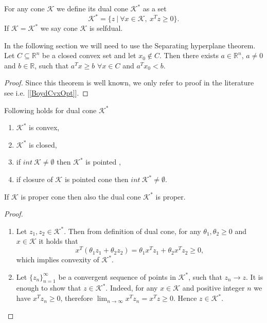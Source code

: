 \documentclass[12pt]{book}
\theoremstyle{definition}
\begin{document}
\begin{appendix}
\label{defDualCone}
For any cone $\mathcal{K}$ we define its dual cone $\mathcal{K}^*$ as a set
\begin{equation}
\mathcal{K}^* = \{z\ |\ \forall x\in\mathcal{K}, \ x^Tz\geq 0\}.
\end{equation}
If  $\mathcal{K} =  \mathcal{K}^*$ we say cone $\mathcal{K}$ is selfdual.



In the following section we will need to use the Separating hyperplane theorem.
\label{SeparatingHyperplaneThm}
Let $C\subseteq \mathbb{R}^n$ be a closed convex set and let $x_0\notin C$. 
Then there exists $a \in \mathbb{R}^n$, $a\neq 0$ and $b\in \mathbb{R}$, such that 
$a^Tx\geq b$ $\forall x\in C$ and $a^Tx_0<b$.
\begin{proof}
Since this theorem is well known, we only refer to proof in the literature see i.e. [\ref{BoydCvxOpt}]. %
\end{proof}

\prop[{[\ref{PokornaSOCPDipl}]}] \label{DualConePropertiesProp}
Following holds for dual cone $\mathcal{K}^*$
\begin{enumerate}
\item  $\mathcal{K}^*$ is convex,
\item  $\mathcal{K}^*$ is closed,
\item if $int \ \mathcal{K}\neq \emptyset$ then $\mathcal{K}^*$ is pointed ,
\item if closure of $\mathcal{K}$ is pointed cone then $int \ \mathcal{K}^*\neq \emptyset$.
\end{enumerate}

\cor \label{DualOfAProperConeCorr}
If $\mathcal{K}$ is proper cone then also the dual cone $\mathcal{K}^*$ is proper.

\begin{proof}
\begin{enumerate}
\item Let $z_1,z_2 \in  \mathcal{K}^*$. Then from definition of dual cone, for any $\theta_1,\theta_2 \geq 0$ and $x \in \mathcal{K}$ it holds that
\begin{equation*}
x^T(\theta_1z_1 + \theta_2z_2) = \theta_1x^Tz_1 + \theta_2x^Tz_2 \geq 0,
\end{equation*}
which implies convexity of $\mathcal{K}^*$.%

\item Let $\{z_n\}_{n=1}^\infty$ be a convergent sequence of points in $\mathcal{K}^*$, such that 
$z_n\rightarrow z$. It is enough to show that $z\in \mathcal{K}^*.$  Indeed, for any $x\in \mathcal{K}$ and positive integer $n$ we have $x^Tz_n \geq 0$, therefore
$\lim_{n\rightarrow \infty} x^Tz_n = x^Tz \geq 0$. Hence $z\in \mathcal{K}^*.$


\end{enumerate}
\end{proof}
\end{appendix}
\end{document}
